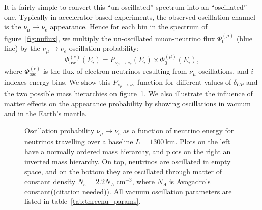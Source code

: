 It is fairly simple to convert this ``un-oscillated'' spectrum into an
``oscillated'' one. Typically in accelerator-based experiments, the observed oscillation channel
is the $\nu_\mu \rightarrow \nu_e$ appearance. Hence for each bin in the
spectrum of figure~\ref{fig:nuflux}, we multiply the un-oscillated
muon-neutrino flux
$\Phi^{(\mu)}_0$ (blue line) by the $\nu_\mu \rightarrow \nu_e$ oscillation
probability:
\begin{equation}
	\Phi^{(e)}_\text{osc} (E_i) = P_{\nu_\mu \rightarrow \nu_e} (E_i) \times
\Phi^{(\mu)}_0 (E_i),\label{eq:flux}\end{equation}
where $\Phi^{(e)}_\text{osc}$ is the flux of electron-neutrinos resulting from
$\nu_\mu$ oscillations, and $i$ indexes energy bins.
We show this $P_{\nu_\mu \rightarrow \nu_e}$ function for different values of
$\delta_{CP}$ and the two possible mass hierarchies on
figure~\ref{fig:dune_prob}. We also illustrate the influence of matter effects
on the appearance probability by showing oscillations in vacuum and in the
Earth's mantle.
\begin{figure}
	\centering
	\caption{Oscillation probability $\nu_\mu \rightarrow \nu_e$ as a function of
	neutrino energy for neutrinos travelling over a baseline $L=\SI{1300}{\km}$.
	Plots on the left have a normally ordered mass hierarchy, and plots on the
	right an inverted mass hierarchy. On top, neutrinos are oscillated in empty
	space, and on the bottom they are oscillated through matter of constant
	density $N_e=2.2 N_A~\si{\cm^{-3}}$, where $N_A$ is Avogadro's
	constant((citation needed)). All vacuum oscillation parameters are
	listed in table~\ref{tab:threenu_params}.}
\label{fig:dune_prob}
\end{figure}

